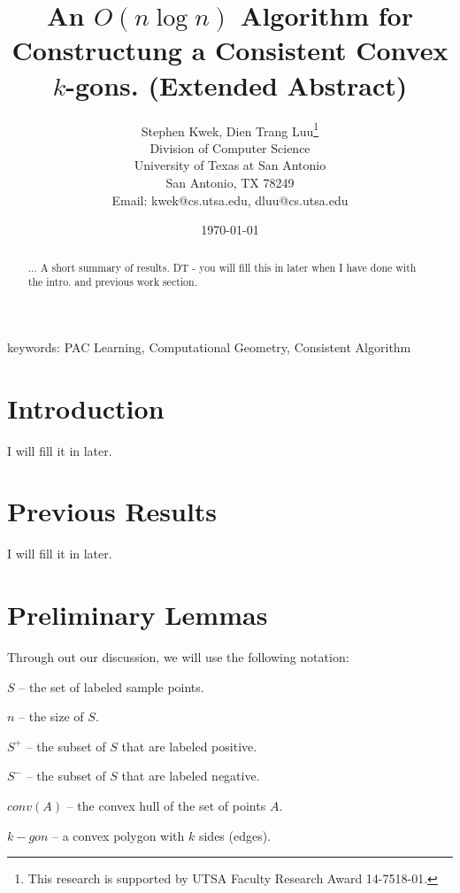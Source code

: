 \documentclass[fullpage,my,12pt]{article}
\begin{document}
\title{An $O(n \log{n})$ Algorithm for Constructung a
Consistent Convex $k$-gons. (Extended Abstract)}
\author{Stephen Kwek, Dien Trang Luu\thanks{This research is
supported by UTSA Faculty Research Award 14-7518-01.} \\
Division of Computer Science \\
University of Texas at San Antonio \\
San Antonio, TX 78249 \\
Email: kwek@cs.utsa.edu, dluu@cs.utsa.edu } \date{\today}
\maketitle

\begin{abstract}
... A short summary of results. DT - you will fill this in later
when I have done with the intro. and previous work section.


\end{abstract}
\thispagestyle{empty}
 
\noindent
{keywords: PAC Learning, Computational Geometry, Consistent
Algorithm}

\newpage

\setcounter{page}{1}
\section{Introduction}
I will fill it in later.

\section{Previous Results}
I will fill it in later.

\section{Preliminary Lemmas}
Through out our discussion, we will use the following notation:

$S$ -- the set of labeled sample points.

$n$ -- the size of $S$.

$S^+$ -- the subset of $S$ that are labeled positive.

$S^-$ -- the subset of $S$ that are labeled negative.

$conv(A)$ -- the convex hull of the set of points $A$.

$k-gon$ -- a convex polygon with $k$ sides (edges).
\end{document}
